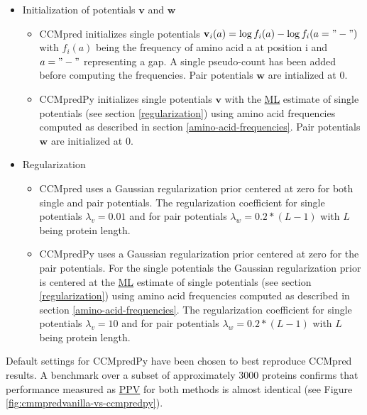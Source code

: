 \documentclass[12pt,a4paper,twoside]{book}
\providecommand{\tightlist}{%
  \setlength{\itemsep}{0pt}\setlength{\parskip}{0pt}}
\renewcommand{\v}{\mathbf{v}}
\newcommand{\w}{\mathbf{w}}
\theoremstyle{definition}
\theoremstyle{definition}
\theoremstyle{remark}
\begin{document}
\begin{itemize}
\tightlist
\item
  Initialization of potentials \(\v\) and \(\w\)

  \begin{itemize}
  \tightlist
  \item
    CCMpred initializes single potentials
    \(\v_i(a) = \log f_i(a) - \log f_i(a= "-")\) with \(f_i(a)\) being
    the frequency of amino acid a at position i and \(a="-"\)
    representing a gap. A single pseudo-count has been added before
    computing the frequencies. Pair potentials \(\w\) are intialized at
    0.
  \item
    CCMpredPy initializes single potentials \(\v\) with the
    \protect\hyperlink{abbrev}{ML} estimate of single potentials (see
    section \ref{regularization}) using amino acid frequencies computed
    as described in section \ref{amino-acid-frequencies}. Pair
    potentials \(\w\) are initialized at 0.
  \end{itemize}
\item
  Regularization

  \begin{itemize}
  \tightlist
  \item
    CCMpred uses a Gaussian regularization prior centered at zero for
    both single and pair potentials. The regularization coefficient for
    single potentials \(\lambda_v = 0.01\) and for pair potentials
    \(\lambda_w = 0.2 * (L-1)\) with \(L\) being protein length.
  \item
    CCMpredPy uses a Gaussian regularization prior centered at zero for
    the pair potentials. For the single potentials the Gaussian
    regularization prior is centered at the
    \protect\hyperlink{abbrev}{ML} estimate of single potentials (see
    section \ref{regularization}) using amino acid frequencies computed
    as described in section \ref{amino-acid-frequencies}. The
    regularization coefficient for single potentials \(\lambda_v = 10\)
    and for pair potentials \(\lambda_w = 0.2 * (L-1)\) with \(L\) being
    protein length.
  \end{itemize}
\end{itemize}

Default settings for CCMpredPy have been chosen to best reproduce
CCMpred results. A benchmark over a subset of approximately 3000
proteins confirms that performance measured as
\protect\hyperlink{abbrev}{PPV} for both methods is almost identical
(see Figure \ref{fig:cmmpredvanilla-vs-ccmpredpy}).
\end{document}
